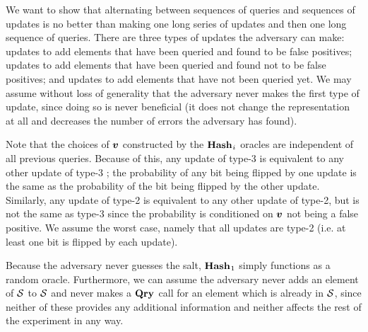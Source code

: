 We want to show that alternating between sequences of queries and sequences of
updates is no better than making one long series of updates and then one long
sequence of queries. There are three types of updates the adversary can make:
updates to add elements that have been queried and found to be false positives;
updates to add elements that have been queried and found not to be false
positives; and updates to add elements that have not been queried yet. We may
assume without loss of generality that the adversary never makes the first type
of update, since doing so is never beneficial (it does not change the
representation at all and decreases the number of errors the adversary has
found). 

Note that the choices of $\boldsymbol{v}$ constructed by the $\textup{\textbf{Hash}}\hspace{0.5pt}_i$ oracles are
independent of all previous queries. Because of this, any update of type-3 is
equivalent to any other update of type-3%
%
%
%
; the probability of any bit being flipped by one update is the same as the
probability of the bit being flipped by the other update. Similarly, any update
of type-2 is equivalent to any other update of type-2, but is not the same as
type-3 since the probability is conditioned on $\boldsymbol{v}$ not being a false positive.
We assume the worst case, namely that all updates are type-2 (i.e. at least one
bit is flipped by each update).

Because the adversary never guesses the salt, $\textup{\textbf{Hash}}\hspace{0.5pt}_1$ simply functions as a
random oracle.
%
%
Furthermore, we can assume the adversary never adds an element of
$\mathcal{S}$ to $\mathcal{S}$%
%
%
and never makes a $\textup{\textbf{Qry}}\hspace{0.5pt}$ call for an element which is already
in $\mathcal{S}$, since neither of these provides any additional information and
neither affects the rest of the experiment in any way.

